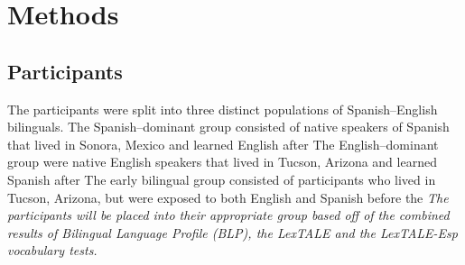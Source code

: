 

\section{Methods}


\subsection{Participants}

The participants were split into three distinct populations of Spanish–English bilinguals. The Spanish–dominant group consisted of native speakers of Spanish that lived in Sonora, Mexico and learned English after %
The English–dominant group were native English speakers that lived in Tucson, Arizona and learned Spanish after %
The early bilingual group consisted of participants who lived in Tucson, Arizona, but were exposed to both English and Spanish before the %
\emph{The participants will be placed into their appropriate group based off of the combined results of Bilingual Language Profile (BLP), the LexTALE and the LexTALE-Esp vocabulary tests.} 


